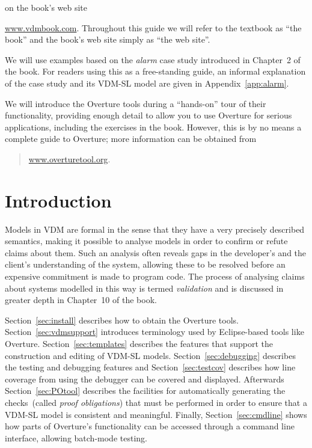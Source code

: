 on the book's web site~{\url{www.vdmbook.com}. Throughout this guide
  we will refer to the textbook as ``the book'' and the book's web
  site simply as ``the web site''.

We will use examples based on the \emph{alarm} case study introduced
in Chapter~2 of the book. For readers using this as a
free-standing guide, an informal explanation of the case study and its
VDM-SL model are given in Appendix~\ref{app:alarm}.

We will introduce the Overture tools during a ``hands-on'' tour of
their functionality, providing enough detail to allow you to use
Overture for serious applications, including the exercises in the
book. However, this is by no means a complete guide to Overture; more
information can be obtained from
\begin{quote}
\url{www.overturetool.org}.
\end{quote}

\section{Introduction}

Models in VDM are formal in the sense that they have a very precisely
described semantics, making it possible to analyse models in order to
confirm or refute claims about them. Such an analysis often reveals
gaps in the developer's and the client's understanding of the system,
allowing these to be resolved before an expensive commitment is made
to program code. The process of analysing claims about systems
modelled in this way is termed \emph{validation} and is discussed in
greater depth in Chapter~10 of the book.

Section~\ref{sec:install} describes how to obtain the Overture tools.
Section~\ref{sec:vdmsupport} introduces terminology used by
Eclipse-based tools like Overture. Section~\ref{sec:templates}
describes the features that support the construction and editing of
VDM-SL models.  Section~\ref{sec:debugging} describes the testing and
debugging features and Section~\ref{sec:testcov} describes how
line coverage from using the debugger can be covered and displayed.
Afterwards Section~\ref{sec:POtool} describes the facilities for automatically
generating the checks~(called \emph{proof obligations}) that must
be performed in order to ensure that a VDM-SL model is consistent and
meaningful.  Finally, Section~\ref{sec:cmdline} shows how parts of
Overture's functionality can be accessed through a command line
interface, allowing batch-mode testing. 

}
